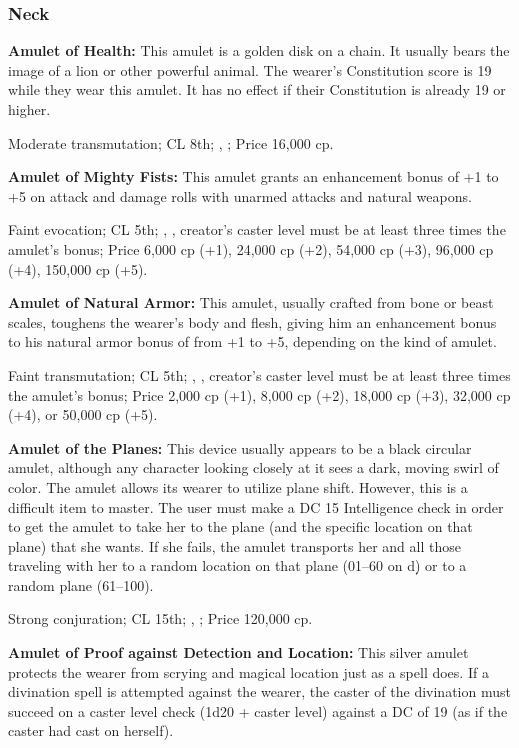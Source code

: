\subsubsection{Neck}

\textbf{Amulet of Health:} This amulet is a golden disk on a chain. It usually bears the image of a lion or other powerful animal. The wearer's Constitution score is 19 while they wear this amulet. It has no effect if their Constitution is already 19 or higher.

Moderate transmutation; CL 8th; , ; Price 16,000 cp.

\textbf{Amulet of Mighty Fists:} This amulet grants an enhancement bonus of +1 to +5 on attack and damage rolls with unarmed attacks and natural weapons.

Faint evocation; CL 5th; , , creator's caster level must be at least three times the amulet's bonus; Price 6,000 cp (+1), 24,000 cp (+2), 54,000 cp (+3), 96,000 cp (+4), 150,000 cp (+5).

\textbf{Amulet of Natural Armor:} This amulet, usually crafted from bone or beast scales, toughens the wearer's body and flesh, giving him an enhancement bonus to his natural armor bonus of from +1 to +5, depending on the kind of amulet.

Faint transmutation; CL 5th; , , creator's caster level must be at least three times the amulet's bonus; Price 2,000 cp (+1), 8,000 cp (+2), 18,000 cp (+3), 32,000 cp (+4), or 50,000 cp (+5).

\textbf{Amulet of the Planes:} This device usually appears to be a black circular amulet, although any character looking closely at it sees a dark, moving swirl of color. The amulet allows its wearer to utilize plane shift. However, this is a difficult item to master. The user must make a DC 15 Intelligence check in order to get the amulet to take her to the plane (and the specific location on that plane) that she wants. If she fails, the amulet transports her and all those traveling with her to a random location on that plane (01--60 on d\d) or to a random plane (61--100).

Strong conjuration; CL 15th; , ; Price 120,000 cp.

\textbf{Amulet of Proof against Detection and Location:} This silver amulet protects the wearer from scrying and magical location just as a  spell does. If a divination spell is attempted against the wearer, the caster of the divination must succeed on a caster level check (1d20 + caster level) against a DC of 19 (as if the caster had cast  on herself).

